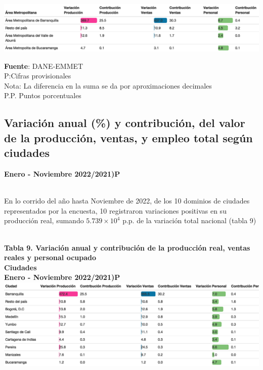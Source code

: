 \documentclass[
]{article}
\begin{document}
\includegraphics{boletin_files/figure-latex/tabla8_view-1.png}

\textbf{Fuente}: DANE-EMMET\\
P:Cifras provisionales\\
Nota: La diferencia en la suma se da por aproximaciones decimales\\
P.P. Puntos porcentuales\\

\hypertarget{variaciuxf3n-anual-y-contribuciuxf3n-del-valor-de-la-producciuxf3n-ventas-y-empleo-total-seguxfan-ciudades-1}{%
\subsection{Variación anual (\%) y contribución, del valor de la
producción, ventas, y empleo total según
ciudades}\label{variaciuxf3n-anual-y-contribuciuxf3n-del-valor-de-la-producciuxf3n-ventas-y-empleo-total-seguxfan-ciudades-1}}

\textbf{Enero - Noviembre 2022/2021)P}\\
\strut \\

En lo corrido del año hasta Noviembre de 2022, de los 10 dominios de
ciudades representados por la encuesta, 10 registraron variaciones
positivas en su producción real, sumando \ensuremath{5.739\times 10^{4}}
p.p. de la variación total nacional (tabla 9)\\
\strut \\
\textbf{Tabla 9. Variación anual y contribución de la producción real,
ventas reales y personal ocupado}\\
\textbf{Ciudades}\\
\textbf{Enero - Noviembre 2022/2021)P}\\

\includegraphics{boletin_files/figure-latex/tabla9_view-1.png}
\end{document}
